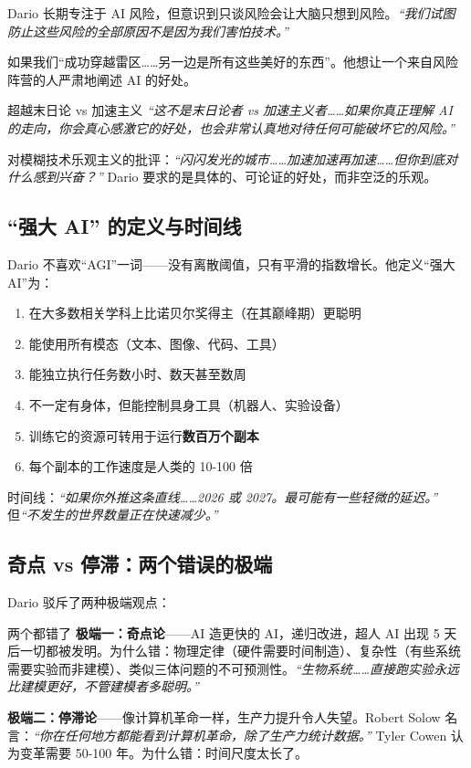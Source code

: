 Dario 长期专注于 AI 风险，但意识到只谈风险会让大脑只想到风险。\textit{``我们试图防止这些风险的全部原因不是因为我们害怕技术。''}

如果我们``成功穿越雷区……另一边是所有这些美好的东西''。他想让一个来自风险阵营的人严肃地阐述 AI 的好处。

\begin{importantbox}{超越末日论 vs 加速主义}
\textit{``这不是末日论者 vs 加速主义者……如果你真正理解 AI 的走向，你会真心感激它的好处，也会非常认真地对待任何可能破坏它的风险。''}

对模糊技术乐观主义的批评：\textit{``闪闪发光的城市……加速加速再加速……但你到底对什么感到兴奋？''} Dario 要求的是具体的、可论证的好处，而非空泛的乐观。
\end{importantbox}

\subsection{``强大 AI'' 的定义与时间线}

Dario 不喜欢``AGI''一词——没有离散阈值，只有平滑的指数增长。他定义``强大 AI''为：

\begin{enumerate}
    \item 在大多数相关学科上比诺贝尔奖得主（在其巅峰期）更聪明
    \item 能使用所有模态（文本、图像、代码、工具）
    \item 能独立执行任务数小时、数天甚至数周
    \item 不一定有身体，但能控制具身工具（机器人、实验设备）
    \item 训练它的资源可转用于运行\textbf{数百万个副本}
    \item 每个副本的工作速度是人类的 10-100 倍
\end{enumerate}

时间线：\textit{``如果你外推这条直线……2026 或 2027。最可能有一些轻微的延迟。''} 但\textit{``不发生的世界数量正在快速减少。''}

\subsection{奇点 vs 停滞：两个错误的极端}

Dario 驳斥了两种极端观点：

\begin{warningbox}{两个都错了}
\textbf{极端一：奇点论}——AI 造更快的 AI，递归改进，超人 AI 出现 5 天后一切都被发明。为什么错：物理定律（硬件需要时间制造）、复杂性（有些系统需要实验而非建模）、类似三体问题的不可预测性。\textit{``生物系统……直接跑实验永远比建模更好，不管建模者多聪明。''}

\textbf{极端二：停滞论}——像计算机革命一样，生产力提升令人失望。Robert Solow 名言：\textit{``你在任何地方都能看到计算机革命，除了生产力统计数据。''} Tyler Cowen 认为变革需要 50-100 年。为什么错：时间尺度太长了。
\end{warningbox}

